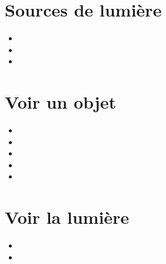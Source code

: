 \documentclass[12pt,a4paper]{article}
\date{}
\title{}
\begin{document}
	
	

\section{Sources de lumière}








\begin{myexos}
	\begin{itemize}
		\item {}
		\item {}
		\item {}
	\end{itemize}
\end{myexos}

\section{Voir un objet}





\begin{myexos}
	\begin{multicols}{2}
	
		\begin{itemize}
			\item {}
			\item {}
			\item {}
			\item {}
			\item {}

		\end{itemize}
	
	\end{multicols}
\end{myexos}


\section{Voir la lumière}





\begin{myexos}
	\begin{itemize}
		\item {}
		\item {}
	\end{itemize}
\end{myexos}
\end{document}
